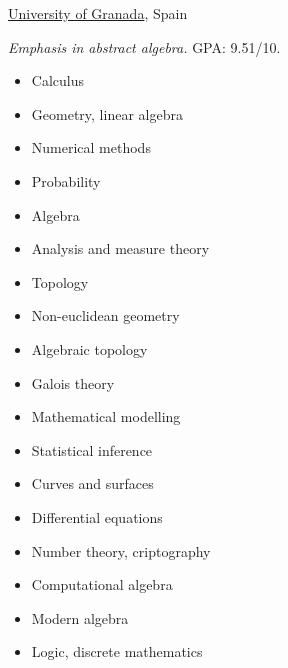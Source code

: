 \documentclass[nocolors]{friggeri-cv-a4}
\begin{document}
\begin{entrylist}


{\href{http://www.ugr.es/en/}{University of Granada}, Spain}
{\emph{Emphasis in abstract algebra.} GPA: 9.51/10.
  {\small
  \begin{multicols}{2}
    \begin{itemize}[topsep=0pt]
    \item Calculus
    \item Geometry, linear algebra
    \item Numerical methods
    \item Probability
    \item Algebra
    \item Analysis and measure theory
    \item Topology
    \item Non-euclidean geometry
    \item Algebraic topology
    \item Galois theory
    \item Mathematical modelling
    \item Statistical inference
    \item Curves and surfaces
    \item Differential equations
    \item Number theory, criptography
    \item Computational algebra
    \item Modern algebra
    \item Logic, discrete mathematics
    \end{itemize}
  \end{multicols}
  }
}


\end{entrylist}
\end{document}
